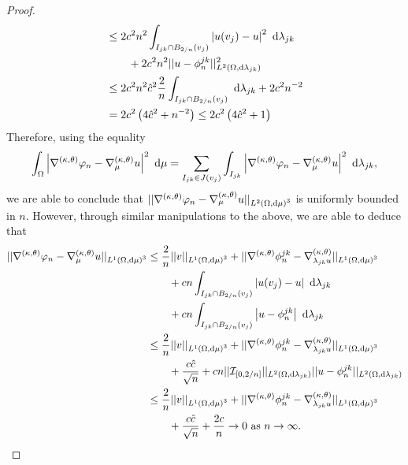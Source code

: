 \begin{proof}
\begin{align*}
		&\leq 2c^2 n^2\integral{I_{jk}\cap B_{2/n}(v_j)}{ \abs{u(v_j)-u}^2 }{\lambda_{jk}} \\
		&\qquad + 2c^2n^2\norm{u-\phi_n^{jk}}_{\ltwo{\ddom}{\lambda_{jk}}}^2 \\
		&\leq 2c^2 n^2 \hat{c}^2 \frac{2}{n}\integral{I_{jk}\cap B_{2/n}(v_j)}{}{\lambda_{jk}} + 2c^2 n^{-2} \\
		&= 2c^2 \bracs{ 4\hat{c}^2 + n^{-2} } \leq 2c^2 \bracs{ 4\hat{c}^2 + 1 }
	\end{align*}
	Therefore, using the equality
	\begin{align*}
		\integral{\ddom}{ \abs{\ktgrad\varphi_n - \ktgrad_{\ddmes}u}^2 }{\ddmes} = \sum_{I_{jk}\in J(v_j)} \integral{I_{jk}}{ \abs{\ktgrad\varphi_n - \ktgrad_{\ddmes}u}^2 }{\lambda_{jk}},
	\end{align*}
	we are able to conclude that $\norm{\ktgrad\varphi_n-\ktgrad_{\ddmes}u}_{\ltwo{\ddom}{\ddmes}^3}$ is uniformly bounded in $n$.
	However, through similar manipulations to the above, we are able to deduce that
	\begin{align*}
		\norm{\ktgrad\varphi_n-\ktgrad_{\ddmes}u}_{L^1\bracs{\ddom,\md\ddmes}^3}
		&\leq \frac{2}{n}\norm{v}_{L^1\bracs{\ddom,\md\ddmes}^3}
		+ \norm{\ktgrad\phi_n^{jk} - \ktgrad_{\lambda_{jk}u}}_{L^1\bracs{\ddom,\md\ddmes}^3} \\
		&\qquad + cn\integral{I_{jk}\cap B_{2/n}(v_j)}{ \abs{u(v_j)-u} }{\lambda_{jk}} \\
		&\qquad + cn\integral{I_{jk}\cap B_{2/n}(v_j)}{ \abs{u-\phi_n^{jk}} }{\lambda_{jk}} \\
		&\leq \frac{2}{n}\norm{v}_{L^1\bracs{\ddom,\md\ddmes}^3}
		+ \norm{\ktgrad\phi_n^{jk} - \ktgrad_{\lambda_{jk}u}}_{L^1\bracs{\ddom,\md\ddmes}^3} \\
		&\qquad + \frac{c\hat{c}}{\sqrt{n}}
		+ cn\norm{\charFunc{\sqbracs{0,2/n}}}_{\ltwo{\ddom}{\lambda_{jk}}}\norm{u-\phi_n^{jk}}_{\ltwo{\ddom}{\lambda_{jk}}} \\
		&\leq \frac{2}{n}\norm{v}_{L^1\bracs{\ddom,\md\ddmes}^3}
		+ \norm{\ktgrad\phi_n^{jk} - \ktgrad_{\lambda_{jk}u}}_{L^1\bracs{\ddom,\md\ddmes}^3} \\
		&\qquad + \frac{c\hat{c}}{\sqrt{n}}
		+ \frac{2c}{n} \rightarrow0 \toInfty{n}.
	\end{align*}
	

\end{proof}
